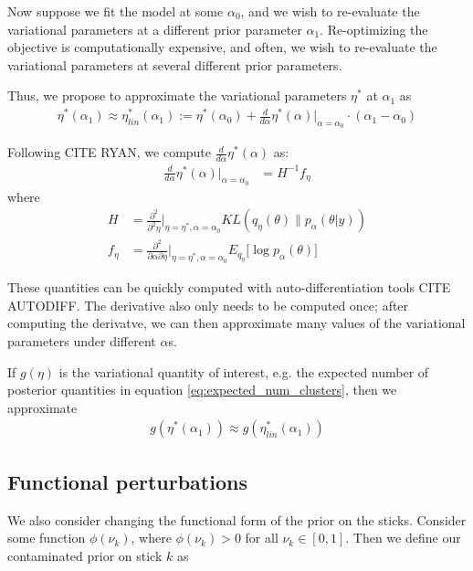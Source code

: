 \documentclass[a4paper]{article}
\begin{document}
Now suppose we fit the model at some $\alpha_0$, and we wish to
re-evaluate the variational parameters at a different prior parameter $\alpha_1$.
Re-optimizing the objective is computationally expensive, and often, we
wish to re-evaluate the variational parameters at several different prior parameters.

Thus, we propose to approximate the variational parameters $\eta^*$ at $\alpha_1$ as
\begin{align}
    \eta^*(\alpha_1) \approx \eta^*_{lin}(\alpha_1)
    := \eta^*(\alpha_0) + \frac{d}{d\alpha}\eta^*(\alpha)\Big|_{\alpha=\alpha_0} \cdot (\alpha_1 - \alpha_0)
    \label{eq:our_approximation}
\end{align}

Following CITE RYAN,  we compute $\frac{d}{d\alpha}\eta^*(\alpha) $ as:
\begin{align}
  \frac{d}{d\alpha}\eta^*(\alpha)\Big|_{\alpha=\alpha_0} &= H^{-1} f_\eta \label{eq:vb_sensitivty}
\end{align}
where
\begin{align}
  H &= \frac{\partial^2}{\partial^2\eta}\Big\rvert_{\eta = \eta^*, \alpha = \alpha_0}
  KL(q_\eta\left(\theta\right) \| p_\alpha(\theta | y)) \\
  f_\eta &= \frac{\partial^2}{\partial \alpha \partial \eta}\Big\rvert_{\eta = \eta^*, \alpha = \alpha_0} E_{q_{\eta}} \big[\log p_\alpha(\theta)\big]
\end{align}

These quantities can be quickly computed with auto-differentiation tools CITE AUTODIFF.
The derivative also only needs to be computed once; after computing the derivatve,
we can then approximate many values of
the variational parameters under different $\alpha$s.

If $g(\eta)$ is the variational quantity of interest,
e.g. the expected number of posterior quantities in equation \ref{eq:expected_num_clusters},
then we approximate
\begin{align}
    g(\eta^*(\alpha_1)) \approx g(\eta^*_{lin}(\alpha_1))
\end{align}

\subsection{Functional perturbations}
\label{sec:func_pert}
We also consider changing the functional form of the prior on the sticks.
Consider some function $\phi(\nu_k)$, where $\phi(\nu_k) > 0$ for all $\nu_k \in [0, 1]$.
Then we define our contaminated prior on stick $k$ as
\end{document}
